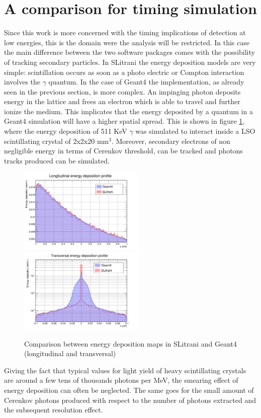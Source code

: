 \section{A comparison for timing simulation}
Since this work is more concerned with the timing implications of detection at low energies, this is the domain were the analysis will be restricted.
In this case the main difference between the two software packages comes with the possibility of tracking secondary particles.
In SLitrani the energy deposition models are very simple: scintillation occurs as soon as a photo electric or Compton interaction involves the $\gamma$ quantum.
In the case of Geant4 the implementation, as already seen in the previous section, is more complex. An impinging photon deposits energy in the lattice and frees an electron which is able to travel and further ionize the medium.
This implicates that the energy deposited by a quantum in a Geant4 simulation will have a higher spatial spread. This is shown in figure \ref{fig:rms}, where the energy deposition of 511 KeV $\gamma$ was simulated to interact inside a LSO scintillating crystal of 2x2x20 mm$^{3}$.
Moreover, secondary electrons of non negligible energy in terms of Cerenkov threshold, can be tracked and photons tracks produced can be simulated. 
\begin{figure}[htbp]
\begin{center}
\includegraphics[width=6cm]{../Pictures/Chapter_5/energy_dep.png}
\includegraphics[width=6cm]{../Pictures/Chapter_5/energy_dep_lat.png}
\end{center}
\caption[RMS comparison]{Comparison between energy deposition maps in SLitrani and Geant4 (longitudinal and transversal)}
\label{fig:rms}
\end{figure}
Giving the fact that typical values for light yield of heavy scintillating crystals are around a few tens of thousands photons per MeV, the smearing effect of energy deposition can often be neglected. The same goes for the small amount of Cerenkov photons produced with respect to the number of photons extracted and the subsequent resolution effect.

